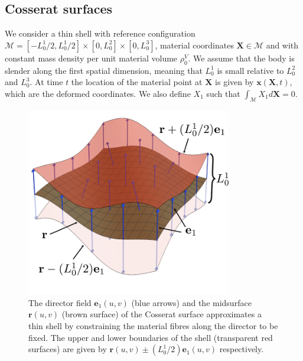 \subsection{Cosserat surfaces} \label{sec:cosserat surfaces}

We consider a thin shell with reference configuration $\mathcal{M} = [-L_0^1/2, L_0^1/2] \times [0, L_0^2] \times [0, L_0^3]$, material coordinates $\mathbf{X} \in \mathcal{M}$ and with constant mass density per unit material volume $\rho^V_0$. We assume that the body is slender along the first spatial dimension, meaning that $L_0^1$ is small relative to $L_0^2$ and $L_0^3$. At time $t$ the location of the material point at $\mathbf{X}$ is given by $\mathbf{x}(\mathbf{X}, t)$, which are the deformed coordinates. We also define $X_1$ such that $\int_\mathcal{M} X_1 d \mathbf{X} = 0$.

\begin{figure}[t]
\centering
        \includegraphics[width=0.8\textwidth]{figs_part2/cosserat_surface/cosserat_kinematics.pdf}
        \caption{The director field $\mathbf{e}_1(u,v)$ (blue arrows) and the midsurface $\mathbf{r}(u,v)$ (brown surface) of the Cosserat surface approximates a thin shell by constraining the material fibres along the director to be fixed. The upper and lower boundaries of the shell (transparent red surfaces) are given by $\mathbf{r}(u,v) \pm (L_0^1 / 2) \mathbf{e}_1(u,v)$ respectively.}
        \label{fig:cosserat surface}
\end{figure}

